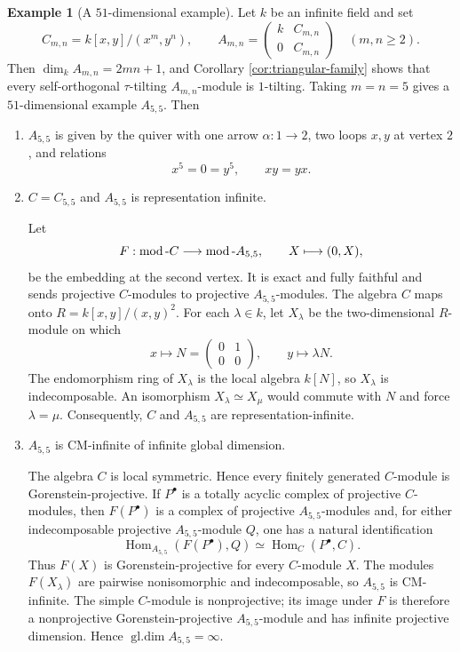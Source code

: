 \documentclass[a4paper,reqno]{amsart}
\theoremstyle{definition}
\newtheorem{example}[theorem]{Example}
\newcommand{\Hom}{\operatorname{Hom}\nolimits}
\numberwithin{equation}{section}
\begin{document}
\begin{example}[A $51$-dimensional example]
\label{ex:triangular-51}
Let $k$ be an infinite field and set
\[
 C_{m,n}=k[x,y]/(x^m,y^n),\qquad
 A_{m,n}=\begin{pmatrix}k&C_{m,n}\\0&C_{m,n}\end{pmatrix}
 \quad(m,n\geq2).
\]
Then $\dim_k A_{m,n}=2mn+1$, and Corollary
\ref{cor:triangular-family} shows that every self-orthogonal
$\tau$-tilting $A_{m,n}$-module is $1$-tilting.  
Taking $m=n=5$ gives a $51$-dimensional example $A_{5,5}$. Then
\vspace{0.2cm}
\begin{enumerate}
\item $A_{5,5}$ is given by the quiver
with one arrow $\alpha:1\to2$, two loops $x,y$ at vertex $2$, and
relations
\[
                       x^5=0=y^5,\qquad xy=yx.
\]

\item $C=C_{5,5}$ and $A_{5,5}$ is representation infinite.  

 Let
\[
          F:\mathop{\rm mod}\nolimits\text{-}C
          \longrightarrow\mathop{\rm mod}\nolimits\text{-}A_{5,5},
          \qquad X\longmapsto (0,X),
\]
be the embedding at the second vertex. It is exact and fully faithful
and sends projective $C$-modules to projective $A_{5,5}$-modules. The
algebra $C$ maps onto $R=k[x,y]/(x,y)^2$. For each $\lambda\in k$, let
$X_\lambda$ be the two-dimensional $R$-module on which
\[
             x\longmapsto N=\begin{pmatrix}0&1\\0&0\end{pmatrix},
             \qquad y\longmapsto\lambda N.
\]
The endomorphism ring of $X_\lambda$ is the local algebra $k[N]$, so
$X_\lambda$ is indecomposable. An isomorphism
$X_\lambda\simeq X_\mu$ would commute with $N$ and force
$\lambda=\mu$. Consequently, $C$ and $A_{5,5}$ are
representation-infinite.

\item $A_{5,5}$ is CM-infinite of infinite global dimension.

 The algebra $C$ is local symmetric. Hence every finitely generated
$C$-module is Gorenstein-projective. If $P^\bullet$ is a totally
acyclic complex of projective $C$-modules, then $F(P^\bullet)$ is a
complex of projective $A_{5,5}$-modules and, for either indecomposable
projective $A_{5,5}$-module $Q$, one has a natural identification
\[
 \Hom_{A_{5,5}}(F(P^\bullet),Q)
       \simeq \Hom_C(P^\bullet,C).
\]
Thus $F(X)$ is Gorenstein-projective for every $C$-module $X$.  The
modules $F(X_\lambda)$ are pairwise nonisomorphic and indecomposable,
so $A_{5,5}$ is CM-infinite. The simple $C$-module is nonprojective;
its image under $F$ is therefore a nonprojective
Gorenstein-projective $A_{5,5}$-module and has infinite projective
dimension. Hence $\operatorname{gl.dim}A_{5,5}=\infty$.


\end{enumerate}
\end{example}
\end{document}
